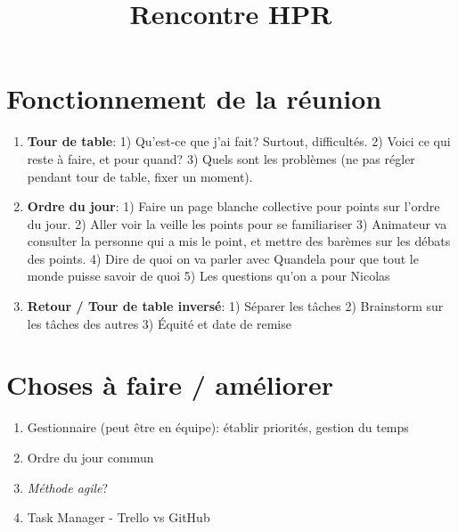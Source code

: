 \documentclass[letterpaper,12pt,oneside,final]{article}
\begin{document}
\title{Rencontre HPR}

\section*{Fonctionnement de la réunion}
\begin{enumerate}
    \item \textbf{Tour de table}: 1) Qu'est-ce que j'ai fait? Surtout, difficultés. 
2) Voici ce qui reste à faire, et pour quand?
3) Quels sont les problèmes (ne pas régler pendant tour de table, fixer un moment). 
    \item \textbf{Ordre du jour}:  1) Faire un page blanche collective pour points sur l'ordre du jour. 
2) Aller voir la veille les points pour se familiariser 
3) Animateur va consulter la personne qui a mis le point, et mettre des barèmes sur les débats des points. 
4) Dire de quoi on va parler avec Quandela pour que tout le monde puisse savoir de quoi 
5) Les questions qu'on a pour Nicolas
\item \textbf{Retour / Tour de table inversé}: 1) Séparer les tâches 
2) Brainstorm sur les tâches des autres 
3) Équité et date de remise
\end{enumerate}

\section*{Choses à faire / améliorer}
\begin{enumerate}
    \item Gestionnaire (peut être en équipe): établir priorités, gestion du temps 
    \item Ordre du jour commun 
    \item \textit{Méthode agile}?
    \item Task Manager - Trello vs GitHub 
\end{enumerate}
\end{document}
